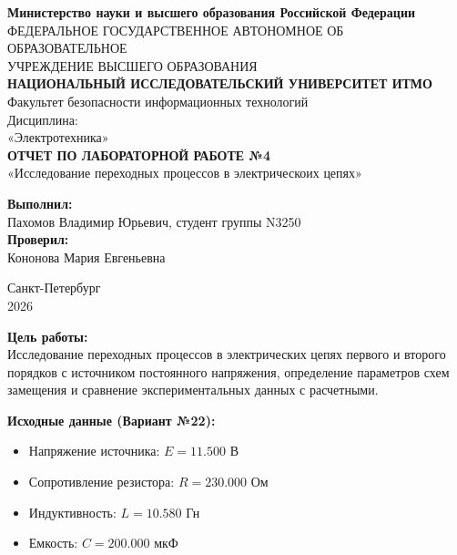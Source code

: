 \documentclass[a4paper,12pt]{article}
\begin{document}
\begin{titlepage}
    \centering
    \textbf{Министерство науки и высшего образования Российской Федерации}\\
    ФЕДЕРАЛЬНОЕ ГОСУДАРСТВЕННОЕ АВТОНОМНОЕ ОБ ОБРАЗОВАТЕЛЬНОЕ\\
    УЧРЕЖДЕНИЕ ВЫСШЕГО ОБРАЗОВАНИЯ\\
    \textbf{НАЦИОНАЛЬНЫЙ ИССЛЕДОВАТЕЛЬСКИЙ УНИВЕРСИТЕТ ИТМО}\\
    \vspace{1cm}
    Факультет безопасности информационных технологий\\
    \vspace{2cm}
    Дисциплина:\\
    «Электротехника»\\
    \vspace{2cm}
    \textbf{ОТЧЕТ ПО ЛАБОРАТОРНОЙ РАБОТЕ №4}\\
    «Исследование переходных процессов в электрическоих цепях» \\
    \vspace{3cm}
    \begin{flushright}
        \textbf{Выполнил:}\\
        Пахомов Владимир Юрьевич, студент группы N3250\\
        \vspace{0.5cm}
        \textbf{Проверил:}\\
        Кононова Мария Евгеньевна\\
    \end{flushright}
    \vfill
    Санкт-Петербург\\
    2026
\end{titlepage}


\newpage


\textbf{Цель работы:} \\
Исследование переходных процессов в электрических цепях первого и второго порядков с источником постоянного напряжения, определение параметров схем замещения и сравнение экспериментальных данных с расчетными.

\textbf{Исходные данные (Вариант №22):}
\begin{itemize}
    \item Напряжение источника: $E = 11.500$ В
    \item Сопротивление резистора: $R = 230.000$ Ом
    \item Индуктивность: $L = 10.580$ Гн
    \item Емкость: $C = 200.000$ мкФ
\end{itemize}
\end{document}

